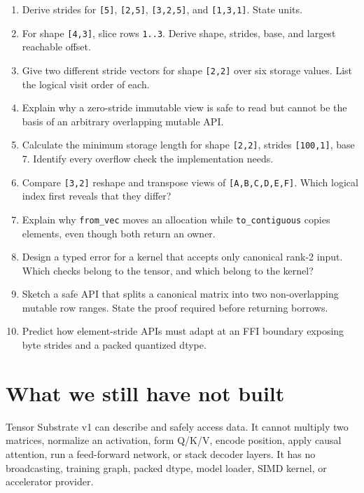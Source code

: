 \begin{enumerate}
\def\labelenumi{\arabic{enumi}.}
\tightlist
\item
  Derive strides for \texttt{{[}5{]}}, \texttt{{[}2,5{]}},
  \texttt{{[}3,2,5{]}}, and \texttt{{[}1,3,1{]}}. State units.
\item
  For shape \texttt{{[}4,3{]}}, slice rows \texttt{1..3}. Derive shape,
  strides, base, and largest reachable offset.
\item
  Give two different stride vectors for shape \texttt{{[}2,2{]}} over
  six storage values. List the logical visit order of each.
\item
  Explain why a zero-stride immutable view is safe to read but cannot be
  the basis of an arbitrary overlapping mutable API.
\item
  Calculate the minimum storage length for shape \texttt{{[}2,2{]}},
  strides \texttt{{[}100,1{]}}, base 7. Identify every overflow check
  the implementation needs.
\item
  Compare \texttt{{[}3,2{]}} reshape and transpose views of
  \texttt{{[}A,B,C,D,E,F{]}}. Which logical index first reveals that
  they differ?
\item
  Explain why \texttt{from\_vec} moves an allocation while
  \texttt{to\_contiguous} copies elements, even though both return an
  owner.
\item
  Design a typed error for a kernel that accepts only canonical rank-2
  input. Which checks belong to the tensor, and which belong to the
  kernel?
\item
  Sketch a safe API that splits a canonical matrix into two
  non-overlapping mutable row ranges. State the proof required before
  returning borrows.
\item
  Predict how element-stride APIs must adapt at an FFI boundary exposing
  byte strides and a packed quantized dtype.
\end{enumerate}

\section{What we still have not
built}\label{what-we-still-have-not-built}

Tensor Substrate v1 can describe and safely access data. It cannot
multiply two matrices, normalize an activation, form Q/K/V, encode
position, apply causal attention, run a feed-forward network, or stack
decoder layers. It has no broadcasting, training graph, packed dtype,
model loader, SIMD kernel, or accelerator provider.

